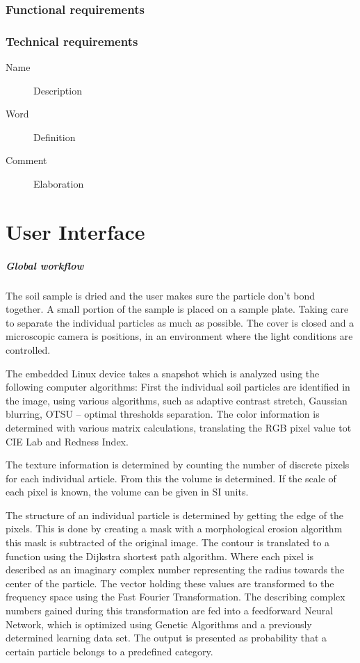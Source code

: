 \documentclass[11pt,fleqn,,a4paper,twoside,openright]{book}
\begin{document}
\subsection{Functional requirements}\label{FunctionalRequirements}


\subsection{Technical requirements}\label{TechnicalRequirements}
\begin{description}
\item[Name] Description
\item[Word] Definition
\item[Comment] Elaboration
\end{description}

\chapter{User Interface}\label{UserInterface}
\paragraph{Global workflow}
The soil sample is dried and the user makes sure the particle don’t bond together. A small portion of the sample is placed on a sample plate. Taking care to separate the individual particles as much as possible. The cover is closed and a microscopic camera is positions, in an environment where the light conditions are controlled.

The embedded Linux device takes a snapshot which is analyzed using the following computer algorithms: First the individual soil particles are identified in the image, using various algorithms, such as adaptive contrast stretch, Gaussian blurring, OTSU – optimal thresholds separation. The color information is determined with various matrix calculations, translating the RGB pixel value tot CIE Lab and Redness Index.

The texture information is determined by counting the number of discrete pixels for each individual article. From this the volume is determined. If the scale of each pixel is known, the volume can be given in SI units.

The structure of an individual particle is determined by getting the edge of the pixels. This is done by creating a mask with a morphological erosion algorithm this mask is subtracted of the original image. The contour is translated to a function using the Dijkstra shortest path algorithm. Where each pixel is described as an imaginary complex number representing the radius towards the center of the particle. The vector holding these values are transformed to the frequency space using the Fast Fourier Transformation. The describing complex numbers gained during this transformation are fed into a feedforward Neural Network, which is optimized using Genetic Algorithms and a previously determined learning data set. The output is presented as probability that a certain particle belongs to a predefined category.
\end{document}
